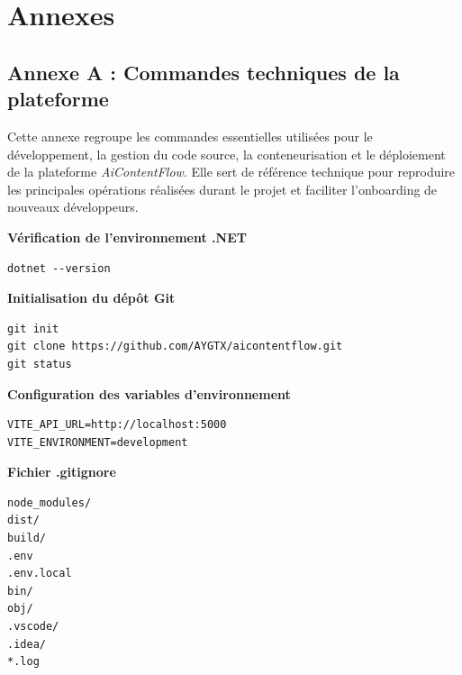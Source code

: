 \appendix
\cleardoublepage

\chapter*{Annexes}

\section*{Annexe A : Commandes techniques de la plateforme}
\label{annexe:commandes-techniques}

Cette annexe regroupe les commandes essentielles utilisées pour le développement, la gestion du code source, la conteneurisation et le déploiement de la plateforme \textit{AiContentFlow}. Elle sert de référence technique pour reproduire les principales opérations réalisées durant le projet et faciliter l'onboarding de nouveaux développeurs.

\vspace{0.5cm}

\textbf{Vérification de l'environnement .NET}

\begin{verbatim}
dotnet --version
\end{verbatim}

\vspace{0.3cm}

\textbf{Initialisation du dépôt Git}

\begin{verbatim}
git init
git clone https://github.com/AYGTX/aicontentflow.git
git status
\end{verbatim}

\vspace{0.3cm}

\textbf{Configuration des variables d'environnement}

\begin{verbatim}
VITE_API_URL=http://localhost:5000
VITE_ENVIRONMENT=development
\end{verbatim}

\vspace{0.3cm}

\textbf{Fichier .gitignore}

\begin{verbatim}
node_modules/
dist/
build/
.env
.env.local
bin/
obj/
.vscode/
.idea/
*.log
\end{verbatim}

